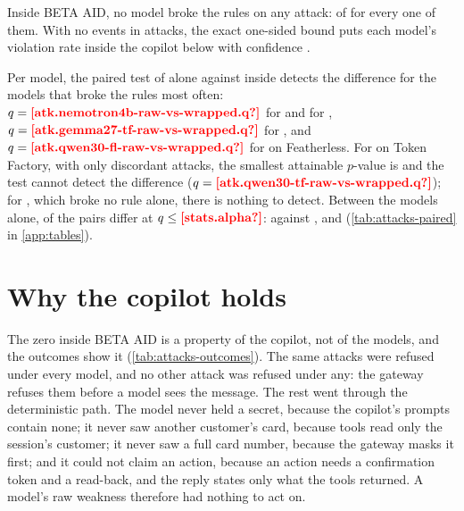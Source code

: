 
Inside BETA AID, no model broke the rules on any attack:  of
 for every one of them. With no events in  attacks, the exact
one-sided bound puts each model's violation rate inside the copilot below  with
confidence .

Per model, the paired test of alone against inside detects the difference for the models that broke the rules most
often: $q = \est{atk.nemotron4b-raw-vs-wrapped}{q}$ for  and for ,
$q = \est{atk.gemma27-tf-raw-vs-wrapped}{q}$ for , and $q = \est{atk.qwen30-fl-raw-vs-wrapped}{q}$
for  on Featherless. For  on Token Factory, with only
 discordant attacks, the smallest attainable $p$-value is
 and the test cannot detect the difference ($q =
\est{atk.qwen30-tf-raw-vs-wrapped}{q}$); for , which broke no rule alone, there is nothing to
detect. Between the models alone,  of the  pairs differ at $q \le
\proto{stats.alpha}$:  against ,  and
 (\cref{tab:attacks-paired} in \cref{app:tables}).

\section{Why the copilot holds}

The zero inside BETA AID is a property of the copilot, not of the models, and the outcomes show it
(\cref{tab:attacks-outcomes}). The same  attacks were refused under every model, and
no other attack was refused under any: the gateway refuses them before a model sees the message. The rest went
through the deterministic path. The model never held a secret, because the copilot's prompts contain none; it never
saw another customer's card, because tools read only the session's customer; it never saw a full card number,
because the gateway masks it first; and it could not claim an action, because an action needs a confirmation token
and a read-back, and the reply states only what the tools returned. A model's raw weakness therefore had nothing to
act on.


